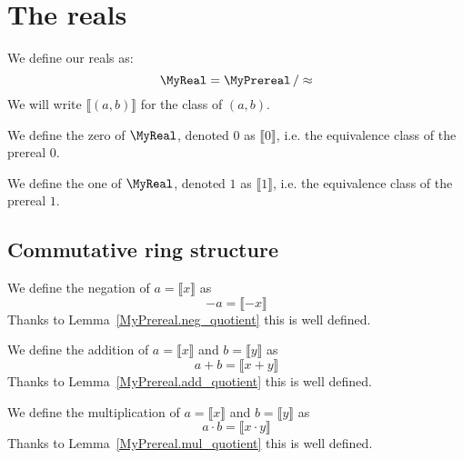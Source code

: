 \section{The reals}

\begin{definition}
    \label{MyReal}
    \leanok
    We define our reals as:
    \[
    \MyReal = \MyPrereal \, / \approx
    \]
    We will write $⟦ (a, b) ⟧$ for the class of $(a,b)$.
\end{definition}


\begin{definition}
    \label{MyReal.zero}
    \leanok
    We define the zero of $\MyReal$, denoted $0$ as $⟦ 0 ⟧$, i.e. the equivalence class of the prereal $0$.
\end{definition}

\begin{definition}
    \label{MyReal.one}
    \leanok
    We define the one of $\MyReal$, denoted $1$ as $⟦ 1 ⟧$, i.e. the equivalence class of the prereal $1$.
\end{definition}

\subsection{Commutative ring structure}

\begin{definition}
    \label{MyReal.neg}
    \leanok
We define the negation of $a = ⟦ x ⟧$ as
\[
-a = ⟦ -x ⟧
\]
Thanks to Lemma~\ref{MyPrereal.neg_quotient} this is well defined.
\end{definition}

\begin{definition}
    \label{MyReal.add}
    \leanok
We define the addition of $a = ⟦ x ⟧$ and $b = ⟦ y ⟧$ as
\[
a + b = ⟦ x+y ⟧
\]
Thanks to Lemma~\ref{MyPrereal.add_quotient} this is well defined.
\end{definition}

\begin{definition}
    \label{MyReal.mul}
    \leanok
We define the multiplication of $a = ⟦ x ⟧$ and $b = ⟦ y ⟧$ as
\[
a \cdot b = ⟦ x \cdot y ⟧
\]
Thanks to Lemma~\ref{MyPrereal.mul_quotient} this is well defined.
\end{definition}

